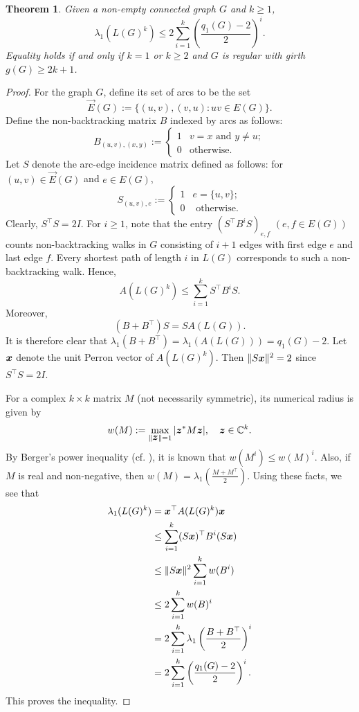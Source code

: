 \documentclass[11pt]{article}
\theoremstyle{plain}
\newtheorem{theorem}{Theorem}[section]
\numberwithin{equation}{section}
\def\x{\mbox{\boldmath $x$}}
\def\z{\mbox{\boldmath $z$}}
\begin{document}
\begin{theorem}\label{thm:spectral_radius_line_graph_power} Given a non-empty connected graph $G$ and $k\ge 1$, 
 \[ \lambda_1(L(G)^k)\le 2\sum_{i=1}^k \left(\frac{q_1(G)-2}{2}\right)^i.\]  
 Equality holds if and only if $k=1$ or $k\ge 2$ and $G$ is regular with girth $g(G)\ge 2k+1$. 
\end{theorem}

\begin{proof} For the graph $G$, define its set of arcs to be the set 
\[\overrightarrow{E}(G):=\{(u,v), (v,u): uv\in E(G)\}.\]
Define the non-backtracking matrix $B$ indexed by arcs as follows:
\[ B_{(u,v), (x,y)}:= 
\begin{cases}
    1 & v = x \text{ and }y\ne u;\\
    0 & \text{otherwise}.
\end{cases}\]
Let $S$ denote the arc-edge incidence matrix defined as follows: for $(u,v)\in \overrightarrow{E}(G)$ and $e\in E(G)$, 
\[ S_{(u,v), e} :=
\begin{cases}
    1 & e = \{u,v\};\\
    0 & \text{ otherwise}.
\end{cases}\]
Clearly, $S^\top S = 2I$. For $i\ge 1$, note that the entry $(S^\top B^iS)_{e,f}$ $(e,f\in E(G))$ counts non-backtracking walks in $G$ consisting of $i+1$ edges with first edge $e$ and last edge $f$. Every shortest path of length $i$ in $L(G)$ corresponds to such a non-backtracking walk. Hence, 
\begin{equation}\label{eq:adjacency_line_comparison}
   A(L(G)^k)\le \sum_{i=1}^k S^\top B^iS. 
\end{equation}
Moreover, 
\begin{equation}\label{eq:B_and_L_G}
    (B + B^\top)S = SA(L(G)). 
\end{equation}
It is therefore clear that $\lambda_1(B+B^\top) = \lambda_1(A(L(G))) = q_1(G)-2$. Let $\x$ denote the unit Perron vector of $A(L(G)^k)$. Then $\|S\x\|^2 = 2$ since $S^\top S = 2I$. 

For a complex $k\times k$ matrix $M$ (not necessarily symmetric), its numerical radius is given by 
\[w(M):=\max_{\|\z\|=1}|\z^* M\z|,\quad \z\in \mathbb{C}^k.\]
By Berger's power inequality (cf. \cite{Berger_Stampfli_1967}), it is known that $w(M^i)\le w(M)^i$. Also, if $M$ is real and non-negative, then $w(M) = \lambda_1\left(\frac{M+M^\top}{2}\right)$. Using these facts, we see that 
\begin{align*}
    \lambda_1(L(G)^k) & = \x^\top A(L(G)^k)\x\\
    & \le \sum_{i=1}^k (S\x)^\top B^i (S\x)\\
    & \le \|S\x\|^2 \sum_{i=1}^k  w(B^i)\\
    & \le 2 \sum_{i=1}^k  w(B)^i\\
    & = 2\sum_{i=1}^k \lambda_1\left(\frac{B+B^\top}{2}\right)^i \\
    & = 2\sum_{i=1}^k \left(\frac{q_1(G)-2}{2}\right)^i. 
\end{align*}
This proves the inequality. 


\end{proof}
\end{document}
